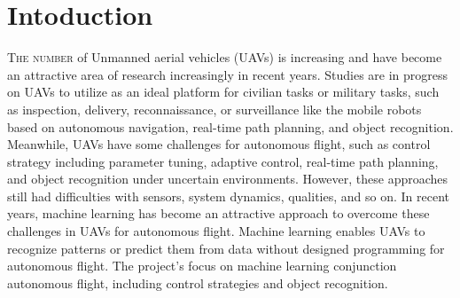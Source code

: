 \chapter{Intoduction}
\label{chap:introduction}
%
\lettrine[lines=3]{T}{he number} of Unmanned aerial vehicles (UAVs) is 
increasing and have become an attractive area of research increasingly in recent 
years.\cite{Boucher:2015aa,daponte2017measurement} 
Studies are in progress on UAVs to utilize as an ideal platform for civilian
tasks or military tasks, such as inspection, delivery, reconnaissance, or
surveillance like the mobile robots based on autonomous navigation, real-time
path planning, and object recognition.\cite{Wang_2018, zhang2016deep}
Meanwhile, UAVs have some challenges for autonomous flight, such as control
strategy including parameter tuning, adaptive control, real-time path planning,
and object recognition under uncertain environments. 
However, these approaches still had difficulties with sensors, system dynamics,
qualities, and so on. 
In recent years, machine learning has become an attractive approach to overcome
these challenges in UAVs for autonomous flight. Machine learning enables UAVs to
recognize patterns or predict them from data without designed programming for
autonomous flight.\cite{advancerobotics2019}
The project's focus on machine learning conjunction autonomous flight, including
control strategies and object recognition.
%
%
